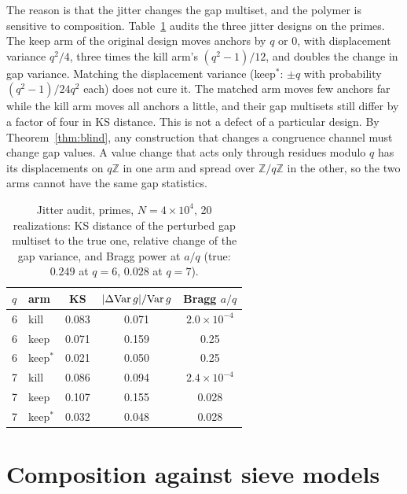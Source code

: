 \documentclass[reprint,amsmath,amssymb,aps,pre,longbibliography]{revtex4-2}
\begin{document}
The reason is that the jitter changes the gap multiset, and the polymer is sensitive to
composition. Table~\ref{tab:audit} audits the three jitter designs on the primes. The keep arm of
the original design moves anchors by $q$ or $0$, with displacement variance $q^2/4$, three times
the kill arm's $(q^2-1)/12$, and doubles the change in gap variance. Matching the displacement
variance (keep$^*$: $\pm q$ with probability $(q^2-1)/24q^2$ each) does not cure it. The matched
arm moves few anchors far while the kill arm moves all anchors a little, and their gap multisets
still differ by a factor of four in KS distance. This is not a defect of a particular design. By
Theorem~\ref{thm:blind}, any construction that changes a congruence channel must change gap
values. A value change that acts only through residues modulo $q$ has its displacements on
$q\mathbb Z$ in one arm and spread over $\mathbb Z/q\mathbb Z$ in the other, so the two arms cannot have
the same gap statistics.

\begin{table}[t]
\caption{Jitter audit, primes, $N=4\times10^4$, 20 realizations: KS distance of the perturbed
gap multiset to the true one, relative change of the gap variance, and Bragg power at $a/q$
(true: $0.249$ at $q=6$, $0.028$ at $q=7$).}
\label{tab:audit}
\begin{ruledtabular}
\begin{tabular}{llccc}
$q$ & arm & KS & $|\Delta{\rm Var}\,g|/{\rm Var}\,g$ & Bragg $a/q$\\ \hline
6 & kill & 0.083 & 0.071 & $2.0\times10^{-4}$\\
6 & keep & 0.071 & 0.159 & 0.25\\
6 & keep$^*$ & 0.021 & 0.050 & 0.25\\
7 & kill & 0.086 & 0.094 & $2.4\times10^{-4}$\\
7 & keep & 0.107 & 0.155 & 0.028\\
7 & keep$^*$ & 0.032 & 0.048 & 0.028\\
\end{tabular}
\end{ruledtabular}
\end{table}

\section{Composition against sieve models}\label{sec:comp}
\end{document}
